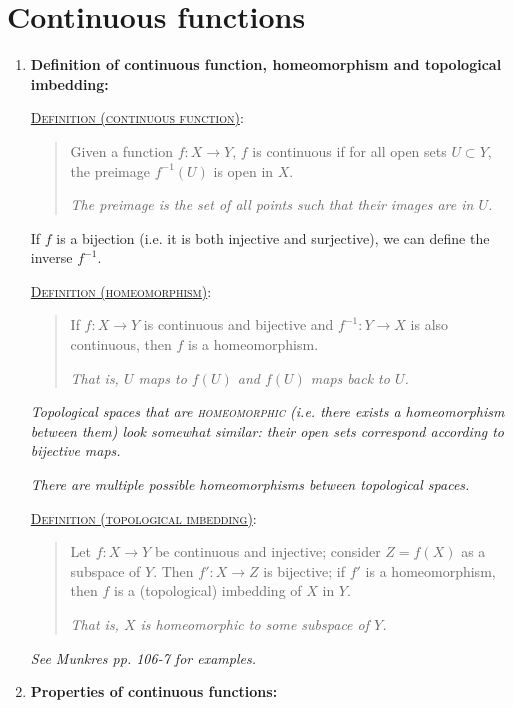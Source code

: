 \documentclass[letterpaper, 12pt]{article}
\newcommand{\defn}[2]{\textsc{\underline{Definition (#1)}:}\begin{quote} #2\end{quote}}
\begin{document}
\section{Continuous functions}
    \begin{enumerate}[resume]
    \item \textbf{Definition of continuous function, homeomorphism and topological imbedding:}

        \defn{continuous function}{Given a function $f:X\to Y$, $f$ is continuous if for all open sets $U\subset Y$, the preimage $f^{-1}(U)$ is open in $X$.

        \textit{The preimage is the set of all points such that their images are in $U$.}}

        If $f$ is a bijection (i.e. it is both injective and surjective), we can define the inverse $f^{-1}$.

        \defn{homeomorphism}{If $f:X\to Y$ is continuous and bijective and $f^{-1}:Y\to X$ is also continuous, then $f$ is a homeomorphism.

        \textit{That is, $U$ maps to $f(U)$ and $f(U)$ maps back to $U$.}}

        \textit{Topological spaces that are \textsc{homeomorphic} (i.e. there exists a homeomorphism between them) look somewhat similar: their open sets correspond according to bijective maps.}

        \textit{There are multiple possible homeomorphisms between topological spaces.}

        \defn{topological imbedding}{Let $f:X\to Y$ be continuous and injective; consider $Z=f(X)$ as a subspace of $Y$. Then $f':X\to Z$ is bijective; if $f'$ is a homeomorphism, then $f$ is a (topological) imbedding of $X$ in $Y$.

        \textit{That is, $X$ is homeomorphic to some subspace of $Y$.}}

        \textit{See Munkres pp. 106-7 for examples.}
    \item \textbf{Properties of continuous functions:}


\end{enumerate}
\end{document}
